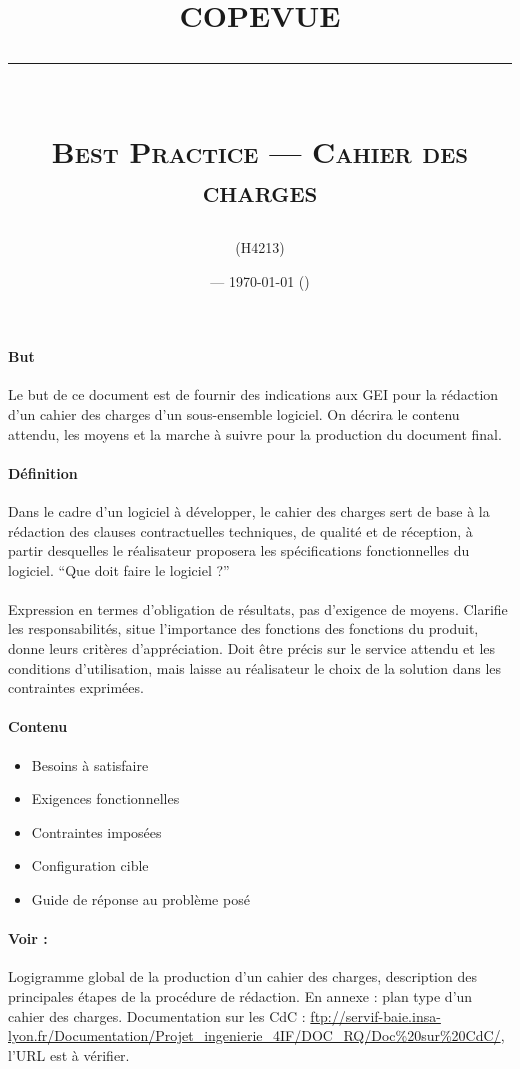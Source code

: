 \documentclass[a4paper, 11pt, draft]{article}
\title{\textbf{COPEVUE}\\
\rule{\textwidth}{1pt}{}\\
\Huge{\textsc{Best Practice --- Cahier des charges}}}
\author{\docauthor{} (H4213)}
\date{\docname{} --- \today{} (\docstatus{})}
\begin{document}
\maketitle

\paragraph{But}
Le but de ce document est de fournir des indications aux GEI pour la rédaction d'un cahier des charges d'un sous-ensemble logiciel. On décrira le contenu attendu, les moyens et la marche à suivre pour la production du document final.

\paragraph{Définition}
Dans le cadre d'un logiciel à développer, le cahier des charges sert de base à la rédaction des clauses contractuelles techniques, de qualité et de réception, à partir desquelles le réalisateur proposera les spécifications fonctionnelles du logiciel. ``Que doit faire le logiciel ?''

\paragraph{}
Expression en termes d'obligation de résultats, pas d'exigence de moyens. Clarifie les responsabilités, situe l'importance des fonctions des fonctions du produit, donne leurs critères d'appréciation. Doit être précis sur le service attendu et les conditions d'utilisation, mais laisse au réalisateur le choix de la solution dans les contraintes exprimées.

\paragraph{Contenu}
\begin{itemize}
\item Besoins à satisfaire
\item Exigences fonctionnelles
\item Contraintes imposées
\item Configuration cible
\item Guide de réponse au problème posé
\end{itemize}

\paragraph{Voir :}
Logigramme global de la production d'un cahier des charges, description des principales étapes de la procédure de rédaction. En annexe : plan type d'un cahier des charges. Documentation sur les CdC : \url{ftp://servif-baie.insa-lyon.fr/Documentation/Projet_ingenierie_4IF/DOC_RQ/Doc\%20sur\%20CdC/}, l'URL est à vérifier.
\end{document}

